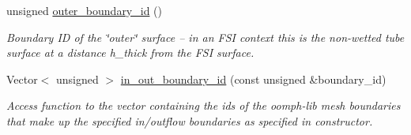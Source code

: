\begin{DoxyCompactItemize}
unsigned \hyperlink{classoomph_1_1ThinLayerBrickOnTetMesh_aa753cb61dc2b1ed692dff8feeff67930}{outer\+\_\+boundary\+\_\+id} ()
\begin{DoxyCompactList}\small\item\em Boundary ID of the \char`\"{}outer\char`\"{} surface -- in an F\+SI context this is the non-\/wetted tube surface at a distance h\+\_\+thick from the F\+SI surface. \end{DoxyCompactList}\item 
Vector$<$ unsigned $>$ \hyperlink{classoomph_1_1ThinLayerBrickOnTetMesh_a3cfd55eb5bbd6801e9d4cd271e602cd8}{in\+\_\+out\+\_\+boundary\+\_\+id} (const unsigned \&boundary\+\_\+id)
\begin{DoxyCompactList}\small\item\em Access function to the vector containing the ids of the oomph-\/lib mesh boundaries that make up the specified in/outflow boundaries as specified in constructor. \end{DoxyCompactList}\end{DoxyCompactItemize}
